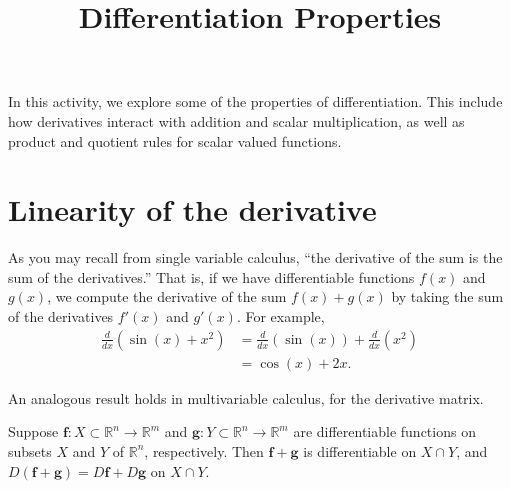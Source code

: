 \documentclass{ximera}
\title{Differentiation Properties}
\begin{document}
\begin{abstract}
\end{abstract}
\maketitle

In this activity, we explore some of the properties of differentiation. This include how derivatives interact with addition and scalar multiplication, as well as product and quotient rules for scalar valued functions.

\section*{Linearity of the derivative}

As you may recall from single variable calculus, ``the derivative of the sum is the sum of the derivatives.'' That is, if we have differentiable functions $f(x)$ and $g(x)$, we compute the derivative of the sum $f(x)+g(x)$ by taking the sum of the derivatives $f'(x)$ and $g'(x)$. For example,
\begin{align*}
\frac{d}{dx}\left(\sin(x)+x^2\right) &= \frac{d}{dx}\left(\sin(x)\right) + \frac{d}{dx}\left(x^2\right)\\
&= \cos(x)+2x.
\end{align*}

An analogous result holds in multivariable calculus, for the derivative matrix.

\begin{proposition}
Suppose $\mathbf{f}:X\subset \mathbb{R}^n\rightarrow \mathbb{R}^m$ and $\mathbf{g}:Y\subset\mathbb{R}^n\rightarrow\mathbb{R}^m$ are differentiable functions on subsets $X$ and $Y$ of $\mathbb{R}^n$, respectively. Then $\mathbf{f}+\mathbf{g}$ is differentiable on $X\cap Y$, and $D(\mathbf{f}+\mathbf{g})=D\mathbf{f}+D\mathbf{g}$ on $X\cap Y$.
\end{proposition}
\end{document}
